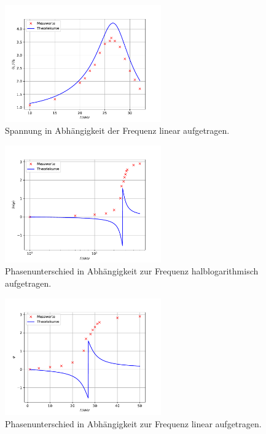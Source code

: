 \begin{figure}
    \centering
    \includegraphics[width=0.6\textwidth]{content/data/plotc2.pdf}
    \caption{Spannung in Abhängigkeit der Frequenz linear aufgetragen.}
    \label{fig:spannung_lin}
\end{figure}

\begin{figure}
    \centering
    \includegraphics[width=0.6\textwidth]{content/data/plotd.pdf}
    \caption{Phasenunterschied in Abhängigkeit zur Frequenz halblogarithmisch aufgetragen.}
    \label{fig:phase_log}
\end{figure}
\begin{figure}
        \centering
        \includegraphics[width=0.6\textwidth]{content/data/plotd2.pdf}
        \caption{Phasenunterschied in Abhängigkeit zur Frequenz linear aufgetragen.} 
        \label{fig:phase_lin}
\end{figure}


